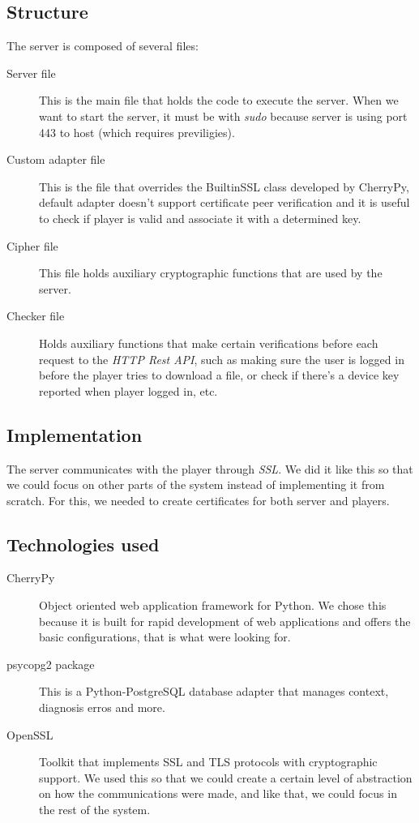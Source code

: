 \documentclass[11pt,a4paper]{report}
\begin{document}
\subsection{Structure}
The server is composed of several files:

\begin{description}
  \item[Server file] This is the main file that holds the code to execute the server. When we want to start the server, it must be with \emph{sudo} because server is using port 443 to host (which requires previligies).
  \item[Custom adapter file] This is the file that overrides the BuiltinSSL class developed by CherryPy, default adapter doesn't support certificate peer verification and it is useful to check if player is valid and associate it with a determined key.
  \item[Cipher file] This file holds auxiliary cryptographic functions that are used by the server.
  \item[Checker file] Holds auxiliary functions that make certain verifications before each request to the \emph{HTTP Rest API}, such as making sure the user is logged in before the player tries to download a file, or check if there's a device key reported when player logged in, etc.
\end{description}

\subsection{Implementation}
The server communicates with the player through \emph{SSL}. We did it like this so that we could focus on other parts of the system instead of implementing it from scratch.
For this, we needed to create certificates for both server and players.

\subsection{Technologies used}
\begin{description}
  \item[CherryPy] Object oriented web application framework for Python. We chose this because it is built for rapid development of web applications and offers the basic configurations, that is what were looking for.
  \item[psycopg2 package] This is a Python-PostgreSQL database adapter that manages context, diagnosis erros and more.
  \item[OpenSSL] Toolkit that implements SSL and TLS protocols with cryptographic support. We used this so that we could create a certain level of abstraction on how the communications were made, and like that, we could focus in the rest of the system.
\end{description}
\end{document}
